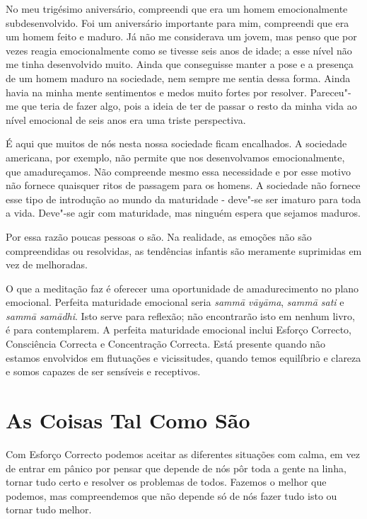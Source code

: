 No meu trigésimo aniversário, compreendi que era um homem emocionalmente
subdesenvolvido. Foi um aniversário importante para mim, compreendi que era um
homem feito e maduro. Já não me considerava um jovem, mas  penso que por vezes 
reagia emocionalmente como se tivesse seis anos de idade; a esse nível não me
tinha desenvolvido muito. Ainda que conseguisse manter a pose e a presença de um
homem maduro na sociedade, nem sempre me sentia dessa forma. Ainda havia na
minha mente sentimentos e medos muito fortes por resolver. Pareceu"-me que teria
de fazer algo, pois a ideia de ter de passar o resto da minha vida ao nível
emocional de seis anos era uma triste perspectiva.

É aqui que muitos de nós nesta nossa sociedade ficam encalhados. A sociedade
americana, por exemplo, não permite que nos desenvolvamos emocionalmente, que
amadureçamos. Não compreende mesmo essa necessidade e por esse motivo não
fornece quaisquer ritos de passagem para os homens. A sociedade não fornece esse
tipo de introdução ao mundo da maturidade - deve"-se ser imaturo para toda a
vida. Deve"-se agir com maturidade, mas ninguém espera que sejamos maduros.

Por essa razão poucas pessoas o são. Na realidade, as emoções não são
compreendidas ou resolvidas, as tendências infantis são meramente suprimidas em
vez de melhoradas.

\enlargethispage{-\baselineskip}

O que a meditação faz é oferecer uma oportunidade de amadurecimento no plano
emocional. Perfeita maturidade emocional seria \emph{sammā vāyāma}, \emph{sammā
  sati} e \emph{sammā samādhi}. Isto serve para reflexão; não encontrarão isto
em nenhum livro, é para contemplarem. A perfeita maturidade emocional inclui
Esforço Correcto, Consciência Correcta e Concentração Correcta. Está presente quando
não estamos envolvidos em flutuações e vicissitudes, quando temos equilíbrio e
clareza e somos capazes de ser sensíveis e receptivos.

\section{As Coisas Tal Como São}

Com Esforço Correcto podemos aceitar as diferentes situações com calma, em vez
de entrar em pânico por pensar que depende de nós pôr toda a gente na linha,
tornar tudo certo e resolver os problemas de todos. Fazemos o melhor que
podemos, mas compreendemos que não depende só de nós fazer tudo isto ou tornar
tudo melhor.

